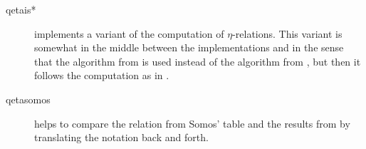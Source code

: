 \documentclass{article}
\begin{document}
\begin{description}
\item[qetais*] implements a variant of the computation of
  $\eta$-relations. This variant is somewhat in the middle between the
  implementations  and  in
  the sense that the algorithm \algoSamba{} from
  \cite{Hemmecke:DancingSambaRamanujan:2018} is used instead of the
  algorithm  from \cite{Radu:RamanujanKolberg:2015}, but then
  it follows the computation as in .

\item[qetasomos] helps to compare the relation from Somos' table and
  the results from  by translating the notation
  back and forth.
\end{description}


\end{document}
